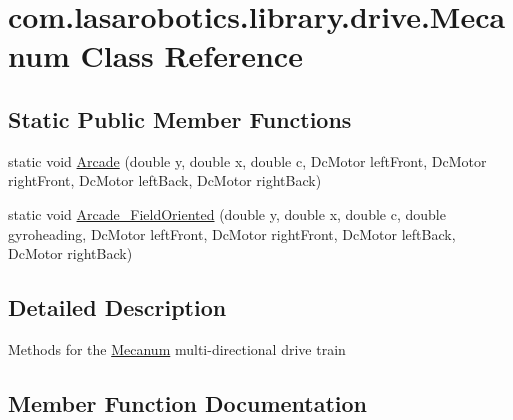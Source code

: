 \hypertarget{classcom_1_1lasarobotics_1_1library_1_1drive_1_1_mecanum}{}\section{com.\+lasarobotics.\+library.\+drive.\+Mecanum Class Reference}
\label{classcom_1_1lasarobotics_1_1library_1_1drive_1_1_mecanum}
\subsection*{Static Public Member Functions}
\begin{DoxyCompactItemize}
\item 
static void \hyperlink{classcom_1_1lasarobotics_1_1library_1_1drive_1_1_mecanum_a8ab2eabd44ba148744ca3480484e731b}{Arcade} (double y, double x, double c, Dc\+Motor left\+Front, Dc\+Motor right\+Front, Dc\+Motor left\+Back, Dc\+Motor right\+Back)
\item 
static void \hyperlink{classcom_1_1lasarobotics_1_1library_1_1drive_1_1_mecanum_a2a6039a767b1a6aa175f5c28ef8f33bd}{Arcade\+\_\+\+Field\+Oriented} (double y, double x, double c, double gyroheading, Dc\+Motor left\+Front, Dc\+Motor right\+Front, Dc\+Motor left\+Back, Dc\+Motor right\+Back)
\end{DoxyCompactItemize}


\subsection{Detailed Description}
Methods for the \hyperlink{classcom_1_1lasarobotics_1_1library_1_1drive_1_1_mecanum}{Mecanum} multi-\/directional drive train 

\subsection{Member Function Documentation}
\hypertarget{classcom_1_1lasarobotics_1_1library_1_1drive_1_1_mecanum_a8ab2eabd44ba148744ca3480484e731b}{}
